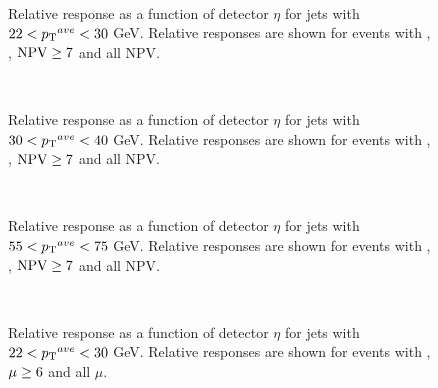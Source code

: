 \begin{figure}
\centering
\mbox{
}
\caption[Relative response as a function of $\eta$ for 3 different pile-up conditions, based on NPV, for jets with $22<\ptave{}<30$ GeV]{
Relative response as a function of detector $\eta$ for jets with $22<\ptave{}<30$ GeV.
Relative responses are shown for events with , , $\rm NPV\ge7$ and all NPV. 
\label{JetPerf:PileupComp_j10}}
\end{figure}



\begin{figure}
\centering
\mbox{
}
\caption[Relative response as a function of $\eta$ for 3 different pile-up conditions, based on NPV, for jets with $30<\ptave{}<40$ GeV]{
Relative response as a function of detector $\eta$ for jets with $30<\ptave{}<40$ GeV.
Relative responses are shown for events with , , $\rm NPV\ge7$ and all NPV. 
\label{JetPerf:PileupComp_j15}}
\end{figure}

\begin{figure}
\centering
\mbox{
}
\caption[Relative response as a function of $\eta$ for 3 different pile-up conditions, based on NPV, for jets with $55<\ptave{}<75$ GeV]{
Relative response as a function of detector $\eta$ for jets with $55<\ptave{}<75$ GeV.
Relative responses are shown for events with , , $\rm NPV\ge7$ and all NPV. 
\label{JetPerf:PileupComp_j20}}
\end{figure}

\begin{figure}
\centering
\mbox{
}
\caption[Relative response as a function of $\eta$ for 2 different pile-up conditions, based on $\mu{}$, for jets with $22<\ptave{}<30$ GeV]{
Relative response as a function of detector $\eta$ for jets with $22<\ptave{}<30$ GeV.
Relative responses are shown for events with , $\rm \mu\ge6$ and all $\mu$. 
\label{JetPerf:MuComp_j10}}
\end{figure}



